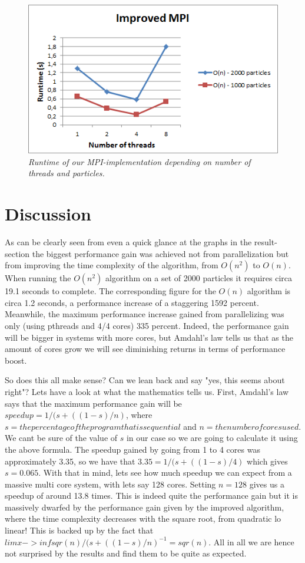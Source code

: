 \documentclass[11pt,a4paper]{article}
\begin{document}
\begin{figure}[htb]
\centering
\includegraphics[scale=0.8]{pics/mpi2.png}
\caption{\emph{Runtime of our MPI-implementation depending on number of threads and particles.}}
\label{fig:gird}
\end{figure}

\newpage
\section{Discussion}
As can be clearly seen from even a quick glance at the graphs in the result-section the biggest performance gain was achieved not from parallelization but from improving the time complexity of the algorithm, from $O(n^{2})$ to $O(n)$. When running the $O(n^{2})$ algorithm on a set of 2000 particles it requires circa 19.1 seconds to complete. The corresponding figure for the $O(n)$ algorithm is circa 1.2 seconds, a performance increase of a staggering 1592 percent. Meanwhile, the maximum performance increase gained from parallelizing was only (using pthreads and 4/4 cores) 335 percent. Indeed, the performance gain will be bigger in systems with more cores, but Amdahl's law tells us that as the amount of cores grow we will see diminishing returns in terms of performance boost.

So does this all make sense? Can we lean back and say "yes, this seems about right"? Lets have a look at what the mathematics tells us. First, Amdahl's law says that the maximum performance gain will be $speedup = 1/(s+((1 - s)/n)$, where $s = the percentage of the program that is sequential$ and $n = the number of cores used$. We cant be sure of the value of $s$ in our case so we are going to calculate it using the above formula. The speedup gained by going from 1 to 4 cores was approximately 3.35, so we have that $3.35 = 1/(s+((1 - s)/4)$ which gives $s = 0.065$. With that in mind, lets see how much speedup we can expect from a massive multi core system, with lets say 128 cores. Setting $n = 128$ gives us a speedup of around 13.8 times. This is indeed quite the performance gain but it is massively dwarfed by the performance gain given by the improved algorithm, where the time complexity decreases with the square root, from quadratic lo linear! This is backed up by the fact that $lim x -> inf sqr(n)/(s+((1 - s)/n)^{-1} = sqr(n)$. All in all we are hence not surprised by the results and find them to be quite as expected.
\end{document}

